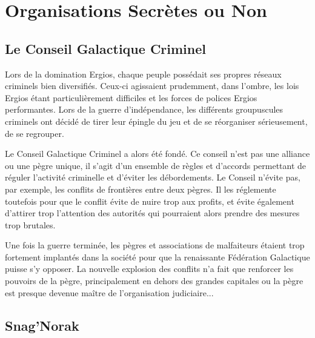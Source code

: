 \chapter{Organisations Secrètes ou Non}

\begin{multicols*}{2}

\section{Le Conseil Galactique Criminel}

Lors de la domination Ergios, chaque peuple possédait ses propres réseaux criminels bien diversifiés. Ceux-ci agissaient prudemment, dans l’ombre, les lois Ergios étant particulièrement difficiles et les forces de polices Ergios performantes. Lors de la guerre d’indépendance, les différents groupuscules criminels ont décidé de tirer leur épingle du jeu et de se réorganiser sérieusement, de se regrouper.

Le Conseil Galactique Criminel a alors été fondé. Ce conseil n'est pas une alliance ou une pègre unique, il s'agit d'un ensemble de règles et d'accords permettant de réguler l'activité criminelle et d'éviter les débordements. Le Conseil n'évite pas, par exemple, les conflits de frontières entre deux pègres. Il les réglemente toutefois pour que le conflit évite de nuire trop aux profits, et évite également d'attirer trop l'attention des autorités qui pourraient alors prendre des mesures trop brutales.

  Une fois la guerre terminée, les pègres et associations de malfaiteurs étaient trop fortement implantés dans la société pour que la renaissante Fédération Galactique puisse s’y opposer. La nouvelle explosion des conflits n'a fait que renforcer les pouvoirs de la pègre, principalement en dehors des grandes capitales ou la pègre est presque devenue maître de l'organisation judiciaire...

\section{Snag'Norak}


\end{multicols*}
